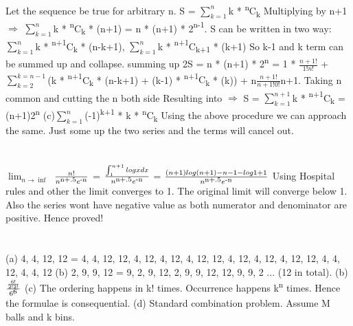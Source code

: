 \documentclass{report}
\begin{document}
{	Let the sequence be true for arbitrary n.
	{\newline} 
	S = {$\sum_{k=1}^{n}$}k * {\textsuperscript{n}}C{\textsubscript{k}}
	Multiplying by n+1 {$\Rightarrow$} {$\sum_{k=1}^{n}$}k * {\textsuperscript{n}}C{\textsubscript{k}} * (n+1) = n * (n+1) * 2{\textsuperscript{n-1}}.
	{\newline}
	S can be written in two way: {$\sum_{k=1}^{n}$}k * {\textsuperscript{n+1}}C{\textsubscript{k}} * (n-k+1), {$\sum_{k=1}^{n}$}k * {\textsuperscript{n+1}}C{\textsubscript{k+1}} * (k+1)
	So k-1 and k term can be summed up and collapse.
	summing up 2S = n * (n+1) * 2{\textsuperscript{n}} = 1 * {$\frac{n+1!}{1!n!}$} + {$\sum_{k=2}^{k=n-1}$}(k * {\textsuperscript{n+1}}C{\textsubscript{k}} * (n-k+1) + (k-1) * {\textsuperscript{n+1}C{\textsubscript{k}}} * (k)) + n{$\frac{n+1!}{n+1!0!}$}n+1. Taking n common and cutting the n both side Resulting into {$\Rightarrow$} S = {$\sum_{k=1}^{n+1}$}k * {\textsuperscript{n+1}}C{\textsubscript{k}} = (n+1)2{\textsuperscript{n}}
	{\newline}
	{\newline}
	(c){$\sum_{k=1}^{n}$}(-1){\textsuperscript{k+1}} * k * {{\textsuperscript{n}C{\textsubscript{k}}}}
	Using the above procedure we can approach the same. Just some up the two series and the terms will cancel out.
	{\newline}
	{\newline}
	\section{}
	{$\lim_{n{\rightarrow}{\inf}}$} {$\frac{n!}{n{\textsuperscript{n+.5}}e{\textsuperscript{-n}}}$} = {$\frac{\int_{1}^{n+1}log x dx}{n{\textsuperscript{n+.5}}e{\textsuperscript{-n}}}$} = {$\frac{(n+1) log (n+1) - n -1 - log1 + 1}{n{\textsuperscript{n+.5}}e{\textsuperscript{-n}}}$} Using Hospital rules and other the limit converges to 1. The original limit will converge below 1. Also the series wont have negative value as both numerator and denominator are positive. Hence proved!
	\section{}
	(a) {4, 4, 12, 12} = {4, 4, 12, 12}, {4, 12, 4, 12}, {4, 12, 12, 4}, {12, 4, 12, 4}, {12, 12, 4, 4}, {12, 4, 4, 12}
	(b) {2, 9, 9, 12} = {9, 2, 9, 12}, {2, 9, 9, 12}, {12, 9, 9, 2} ... (12 in total).
	(b) {$\frac{{\frac{6!}{2!2!}}}{6{\textsuperscript{6}}}$}	
	{\newline}
	(c) The ordering happens in k! times. Occurrence happens k{\textsuperscript{n}}  times. Hence the formulae is consequential.
	{\newline}
	(d) Standard combination problem. Assume M balls and k bins.
	
}
\end{document}
